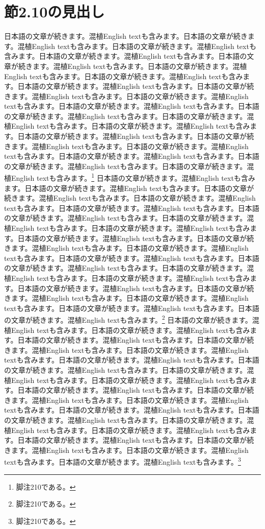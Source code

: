 \documentclass[pdflatex,book]{jlreq}
\begin{document}
\section{節2.10の見出し}
日本語の文章が続きます。混植English textも含みます。日本語の文章が続きます。混植English textも含みます。日本語の文章が続きます。混植English textも含みます。日本語の文章が続きます。混植English textも含みます。日本語の文章が続きます。混植English textも含みます。日本語の文章が続きます。混植English textも含みます。日本語の文章が続きます。混植English textも含みます。日本語の文章が続きます。混植English textも含みます。日本語の文章が続きます。混植English textも含みます。日本語の文章が続きます。混植English textも含みます。日本語の文章が続きます。混植English textも含みます。日本語の文章が続きます。混植English textも含みます。日本語の文章が続きます。混植English textも含みます。日本語の文章が続きます。混植English textも含みます。日本語の文章が続きます。混植English textも含みます。日本語の文章が続きます。混植English textも含みます。日本語の文章が続きます。混植English textも含みます。日本語の文章が続きます。混植English textも含みます。日本語の文章が続きます。混植English textも含みます。日本語の文章が続きます。混植English textも含みます。\footnote{脚注210である。}
日本語の文章が続きます。混植English textも含みます。日本語の文章が続きます。混植English textも含みます。日本語の文章が続きます。混植English textも含みます。日本語の文章が続きます。混植English textも含みます。日本語の文章が続きます。混植English textも含みます。日本語の文章が続きます。混植English textも含みます。日本語の文章が続きます。混植English textも含みます。日本語の文章が続きます。混植English textも含みます。日本語の文章が続きます。混植English textも含みます。日本語の文章が続きます。混植English textも含みます。日本語の文章が続きます。混植English textも含みます。日本語の文章が続きます。混植English textも含みます。日本語の文章が続きます。混植English textも含みます。日本語の文章が続きます。混植English textも含みます。日本語の文章が続きます。混植English textも含みます。日本語の文章が続きます。混植English textも含みます。日本語の文章が続きます。混植English textも含みます。日本語の文章が続きます。混植English textも含みます。日本語の文章が続きます。混植English textも含みます。日本語の文章が続きます。混植English textも含みます。\footnote{脚注210である。}
日本語の文章が続きます。混植English textも含みます。日本語の文章が続きます。混植English textも含みます。日本語の文章が続きます。混植English textも含みます。日本語の文章が続きます。混植English textも含みます。日本語の文章が続きます。混植English textも含みます。日本語の文章が続きます。混植English textも含みます。日本語の文章が続きます。混植English textも含みます。日本語の文章が続きます。混植English textも含みます。日本語の文章が続きます。混植English textも含みます。日本語の文章が続きます。混植English textも含みます。日本語の文章が続きます。混植English textも含みます。日本語の文章が続きます。混植English textも含みます。日本語の文章が続きます。混植English textも含みます。日本語の文章が続きます。混植English textも含みます。日本語の文章が続きます。混植English textも含みます。日本語の文章が続きます。混植English textも含みます。日本語の文章が続きます。混植English textも含みます。日本語の文章が続きます。混植English textも含みます。日本語の文章が続きます。混植English textも含みます。日本語の文章が続きます。混植English textも含みます。\footnote{脚注210である。}
\end{document}
